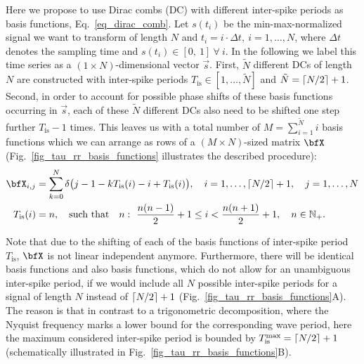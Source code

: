 \documentclass[entropy,article,submit,pdftex,moreauthors]{Definitions/mdpi}
\DeclarePairedDelimiter\ceil{\lceil}{\rceil}
\begin{document}
Here we propose to use Dirac combs (DC) with 
different inter-spike periods as basis functions, Eq.~\eqref{eq_dirac_comb}. Let $s(t_i)$ be the min-max-normalized signal we want to transform of length $N$ and 
$t_i=i\cdot \Delta t,~i=1,\ldots,N$, where $\Delta t$ denotes the sampling time and $s(t_i) \in [0,\ 1]\ \forall\ i$. In the following we label this time series as a $(1\times N)$-dimensional 
vector $\vec{s}$. 
First, $\tilde{N}$ different DCs of length $N$ are constructed with inter-spike periods $T_\text{is} \in [1,\ldots,\tilde{N}]$ and $\tilde{N}=\ceil*{N/2}+1$. Second, in order to account 
for possible phase shifts of 
these basis functions occurring in $\vec{s}$, each of these $\tilde{N}$ different DCs also need to be shifted one step further $T_\text{is}-1$ times. This leaves us with a total number of 
$M = \sum_{i=1}^{\tilde{N}}i$ 
basis functions which we can arrange as rows of a $(M\times N)$-sized matrix $\bfX$
(Fig.~\ref{fig_tau_rr_basis_functions} illustrates the described procedure):
\begin{align}
\label{eq_basis_matrix} 
\bfX_{i,j} &= \sum_{k=0}^{N}\delta\bigl(j-1-kT_\text{is}(i)-i+T_\text{is}(i) \bigr), \quad i=1,\dots,\ceil*{N/2}+1, \quad j=1,\dots,N\\
\label{eq_T_is} T_\text{is}(i)&= n, \quad \text{such that}\quad n:~ \frac{n(n-1)}{2} + 1 \leq i <  \frac{n(n+1)}{2} + 1,\quad n \in \mathbb{N}_+.
\end{align}

Note that due to the shifting of each of the basis functions of inter-spike period $T_\text{is}$, $\bfX$ is not linear independent anymore. 
Furthermore, there will be identical basis functions and also basis functions, which do not allow for an unambiguous inter-spike period, 
if we would include all $N$ possible inter-spike periods for a signal of length $N$ instead of $\ceil*{N/2}+1$ (Fig.~\ref{fig_tau_rr_basis_functions}A).
The reason is that in contrast to a trigonometric decomposition, where the Nyquist frequency marks a lower bound for the corresponding wave period, here 
the maximum considered inter-spike period is bounded by $T_{\text{is}}^{\text{max}} = \ceil*{N/2}+1$ (schematically illustrated in 
Fig.~\ref{fig_tau_rr_basis_functions}B).\\ 
\end{document}
